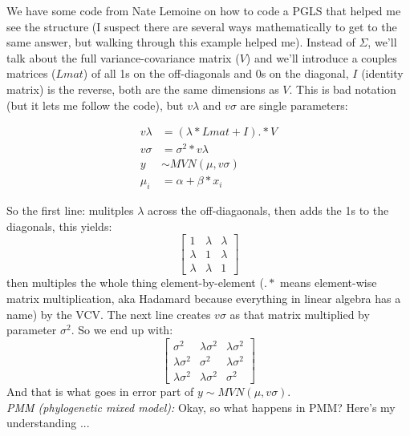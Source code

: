 \documentclass[11pt,letter]{article}
\begin{document}
We have some code from Nate Lemoine on how to code a PGLS that helped me see the structure (I suspect there are several ways mathematically to get to the same answer, but walking through this example helped me). Instead of $\Sigma$, we'll talk about the full variance-covariance matrix ($V$) and we'll introduce a couples matrices ($Lmat$) of all 1s on the off-diagonals and 0s on the diagonal, $I$ (identity matrix) is the reverse, both are the same dimensions as $V$. This is bad notation (but it lets me follow the code), but $v\lambda$ and $v\sigma$ are single parameters:

\begin{align}
v\lambda & = (\lambda*Lmat + I) .* V\\
v\sigma & = \sigma^2*v\lambda\\
y & \sim MVN(\mu, v\sigma )\\
\mu_i & = \alpha +  \beta*x_i
\end{align}

So the first line: mulitples $\lambda$ across the off-diagaonals, then adds the 1s to the diagonals, this yields:
\begin{equation}
 \begin{bmatrix}
  1 &  \lambda & \lambda \\
  \lambda  & 1 & \lambda \\
  \lambda & \lambda &   1
 \end{bmatrix}
\end{equation}
then multiples the whole thing element-by-element ($.*$ means element-wise matrix multiplication, aka Hadamard because everything in linear algebra has a name) by the VCV. The next line creates $v\sigma$ as that matrix multiplied by parameter $\sigma^2$. So we end up with:
\begin{equation}
 \begin{bmatrix}
  \sigma^2 &  \lambda \sigma^2 & \lambda \sigma^2 \\
  \lambda \sigma^2  & \sigma^2 & \lambda \sigma^2 \\
  \lambda \sigma^2 & \lambda \sigma^2 &   \sigma^2
 \end{bmatrix}
\end{equation}
And that is what goes in error part of $ y \sim MVN(\mu, v\sigma )$.\\

\emph{PMM (phylogenetic mixed model):} Okay, so what happens in PMM? Here's my understanding ... \\
\end{document}
